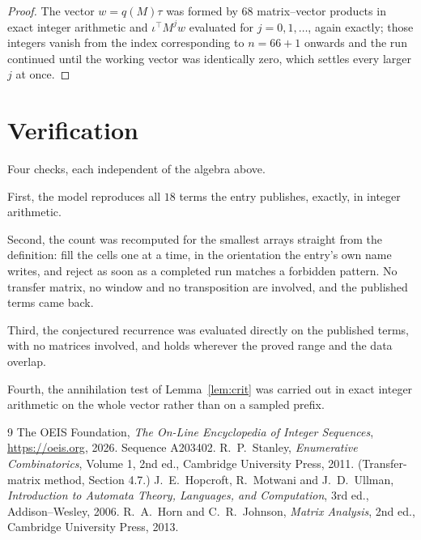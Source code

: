\documentclass[11pt,a4paper]{article}
\theoremstyle{plain}
\theoremstyle{definition}
\begin{document}
\begin{proof}
The vector $w=q(M)\tau$ was formed by $68$ matrix--vector products in exact integer
arithmetic and $\iota^{\!\top}M^{j}w$ evaluated for $j=0,1,\dots$, again exactly; those
integers vanish from the index corresponding to $n=66+1$ onwards and the run continued
until the working vector was identically zero, which settles every larger $j$ at once.
\end{proof}

\section{Verification}

Four checks, each independent of the algebra above.

First, the model reproduces all $18$ terms the entry publishes, exactly, in integer
arithmetic.

Second, the count was recomputed for the smallest arrays straight from the definition: fill the
cells one at a time, in the orientation the entry's own name writes, and reject as soon as a
completed run matches a forbidden pattern. No transfer matrix, no window and no transposition
are involved, and the published terms came back.

Third, the conjectured recurrence was evaluated directly on the published terms, with no
matrices involved, and holds wherever the proved range and the data overlap.

Fourth, the annihilation test of Lemma~\ref{lem:crit} was carried out in exact integer
arithmetic on the whole vector rather than on a sampled prefix.

\begin{thebibliography}{9}
 The OEIS Foundation, \emph{The On-Line Encyclopedia of Integer
Sequences}, \url{https://oeis.org}, 2026. Sequence A203402.
 R.~P.~Stanley, \emph{Enumerative Combinatorics}, Volume 1, 2nd ed.,
Cambridge University Press, 2011. (Transfer-matrix method, Section 4.7.)
 J.~E.~Hopcroft, R.~Motwani and J.~D.~Ullman, \emph{Introduction to Automata
Theory, Languages, and Computation}, 3rd ed., Addison--Wesley, 2006.
 R.~A.~Horn and C.~R.~Johnson, \emph{Matrix Analysis}, 2nd ed., Cambridge
University Press, 2013.
\end{thebibliography}
\end{document}
